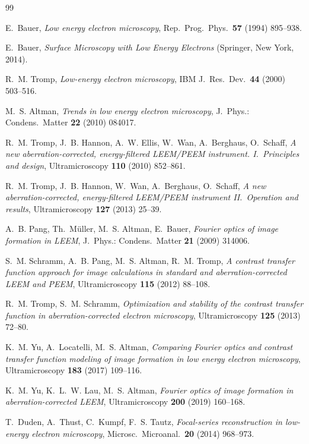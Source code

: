 \documentclass[11pt,a4paper]{article}
\theoremstyle{definition}
\theoremstyle{remark}
\begin{document}
\begin{thebibliography}{99}

E.~Bauer,
\emph{Low energy electron microscopy},
Rep.\ Prog.\ Phys.\ \textbf{57} (1994) 895--938.

E.~Bauer,
\emph{Surface Microscopy with Low Energy Electrons}
(Springer, New York, 2014).

R.~M. Tromp,
\emph{Low-energy electron microscopy},
IBM J.\ Res.\ Dev.\ \textbf{44} (2000) 503--516.

M.~S. Altman,
\emph{Trends in low energy electron microscopy},
J.\ Phys.: Condens.\ Matter \textbf{22} (2010) 084017.

R.~M. Tromp, J.~B. Hannon, A.~W. Ellis, W.~Wan, A.~Berghaus, O.~Schaff,
\emph{A new aberration-corrected, energy-filtered LEEM/PEEM instrument.
I.\ Principles and design},
Ultramicroscopy \textbf{110} (2010) 852--861.

R.~M. Tromp, J.~B. Hannon, W.~Wan, A.~Berghaus, O.~Schaff,
\emph{A new aberration-corrected, energy-filtered LEEM/PEEM instrument
II.\ Operation and results},
Ultramicroscopy \textbf{127} (2013) 25--39.

A.~B. Pang, Th.~M\"uller, M.~S. Altman, E.~Bauer,
\emph{Fourier optics of image formation in LEEM},
J.\ Phys.: Condens.\ Matter \textbf{21} (2009) 314006.

S.~M. Schramm, A.~B. Pang, M.~S. Altman, R.~M. Tromp,
\emph{A contrast transfer function approach for image calculations
in standard and aberration-corrected LEEM and PEEM},
Ultramicroscopy \textbf{115} (2012) 88--108.

R.~M. Tromp, S.~M. Schramm,
\emph{Optimization and stability of the contrast transfer function
in aberration-corrected electron microscopy},
Ultramicroscopy \textbf{125} (2013) 72--80.

K.~M. Yu, A.~Locatelli, M.~S. Altman,
\emph{Comparing Fourier optics and contrast transfer function modeling
of image formation in low energy electron microscopy},
Ultramicroscopy \textbf{183} (2017) 109--116.

K.~M. Yu, K.~L.~W. Lau, M.~S. Altman,
\emph{Fourier optics of image formation in aberration-corrected LEEM},
Ultramicroscopy \textbf{200} (2019) 160--168.

T.~Duden, A.~Thust, C.~Kumpf, F.~S. Tautz,
\emph{Focal-series reconstruction in low-energy electron microscopy},
Microsc.\ Microanal.\ \textbf{20} (2014) 968--973.


\end{thebibliography}
\end{document}
